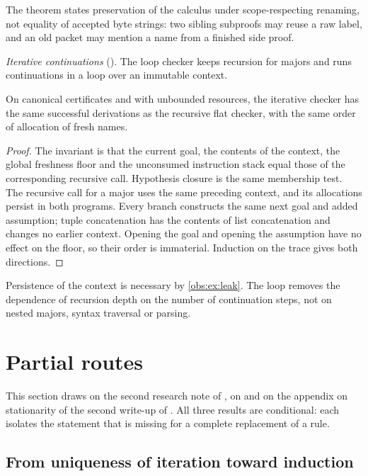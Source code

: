 The theorem states preservation of the calculus under scope-respecting
renaming, not equality of accepted byte strings: two sibling subproofs may
reuse a raw label, and an old packet may mention a name from a finished side
proof.

\emph{Iterative continuations} (). The loop checker keeps
recursion for majors and runs continuations in a loop over an immutable
context.

\begin{lemma}
\label{obs:lem:continuation}
On canonical certificates and with unbounded resources, the iterative checker
has the same successful derivations as the recursive flat checker, with the
same order of allocation of fresh names.
\end{lemma}

\begin{proof}
The invariant is that the current goal, the contents of the context, the
global freshness floor and the unconsumed instruction stack equal those of the
corresponding recursive call. Hypothesis closure is the same membership test.
The recursive call for a major uses the same preceding context, and its
allocations persist in both programs. Every branch constructs the same next
goal and added assumption; tuple concatenation has the contents of list
concatenation and changes no earlier context. Opening the goal and opening the
assumption have no effect on the floor, so their order is immaterial.
Induction on the trace gives both directions.
\end{proof}

Persistence of the context is necessary by \cref{obs:ex:leak}. The loop removes
the dependence of recursion depth on the number of continuation steps, not on
nested majors, syntax traversal or parsing.

\section{Partial routes}
\label{obs:sec:partial}

This section draws on the second research note of , on
 and on the appendix on stationarity of the second write-up
of . All three results are conditional: each
isolates the statement that is missing for a complete replacement of a rule.

\subsection{From uniqueness of iteration toward induction}

